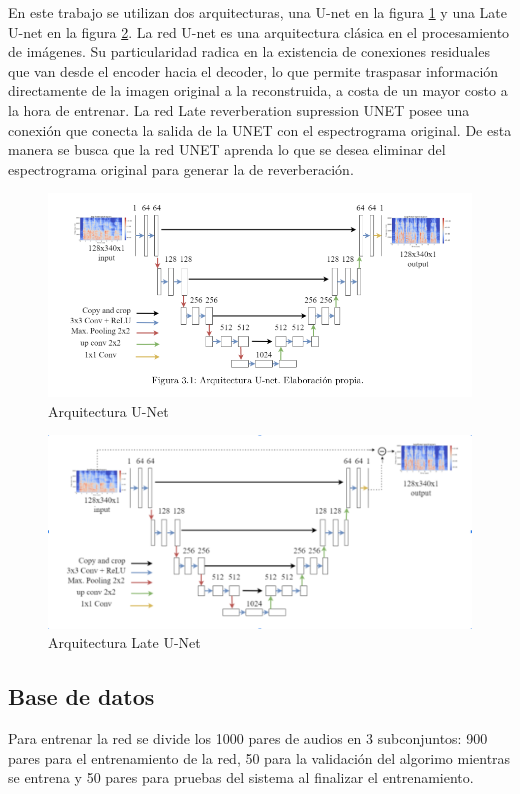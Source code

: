 En este trabajo se utilizan dos arquitecturas, una U-net en la figura \ref{fig:unet} y una Late U-net en la figura \ref{fig:Late_unet}. La red U-net es una arquitectura clásica en el procesamiento de imágenes. Su particularidad radica en la existencia de conexiones residuales que van desde el encoder hacia el decoder, lo que permite traspasar información directamente de la imagen original a la reconstruida, a costa de un mayor costo a la hora de entrenar. 
La red Late reverberation supression UNET posee una conexión que conecta la salida de la UNET con el espectrograma original. De esta manera se busca que la red UNET aprenda lo que se desea eliminar del espectrograma original para generar la de reverberación.


\begin{figure}
    \centering
    \includegraphics[scale=0.4]{img/unet.png}
    \caption{Arquitectura U-Net}
    \label{fig:unet}
\end{figure}

\begin{figure}
    \centering
    \includegraphics[scale=0.4]{img/Late_U-net.png}
    \caption{Arquitectura Late U-Net}
    \label{fig:Late_unet}
\end{figure}

\subsection{Base de datos}
Para entrenar la red se divide los 1000 pares de audios en 3 subconjuntos:
900 pares para el entrenamiento de la red, 50 para la validación del algorimo mientras se entrena y 50 pares para pruebas del sistema al finalizar el entrenamiento.


